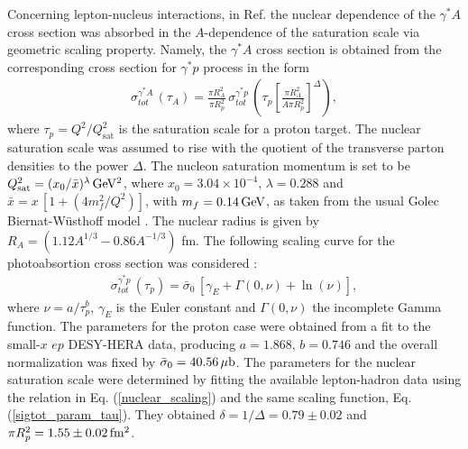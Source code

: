 \documentclass[twocolumn,showpacs,preprintnumbers,amsmath,amssymb,showkeys,aps,prd,a4paper,byrevtex]{revtex4}
\begin{document}
Concerning lepton-nucleus interactions, in Ref. \cite{Armesto_scal} the nuclear dependence of the $\gamma^*A$ cross section was absorbed in the $A$-dependence of the saturation scale via geometric scaling property. Namely, the $\gamma^*A$ cross section is obtained from the corresponding cross section for $\gamma^*p$ process in the form 
\begin{eqnarray}
 \sigma^{\gamma^*A}_{tot}\,(\tau_A)  =  \frac{\pi R_A^2}{\pi R_p^2}\,\sigma^{\gamma^*p}_{tot}\,\left(\tau_p\left[\frac{ \pi R_A^2}{A\pi R_p^2}\right]^{\Delta}\right),
\label{nuclear_scaling}
\end{eqnarray}
where $\tau_p = {Q^2}/{Q_{\mathrm{sat}}^2}$ is the saturation scale for a proton target.  The nuclear saturation scale was assumed to rise with the quotient of the transverse parton densities to the power $\Delta $. The nucleon saturation momentum is set to be $Q^2_{\mathrm{sat}}=\unit[(x_0/\bar{x})^{\lambda}]{GeV^2}$, where $x_0= 3.04\times 10^{-4}$, $\lambda=0.288$ and $\bar{x}=x\,[1+ (4m_f^2/Q^2)]$, with $m_f=\unit[0.14]{GeV}$, as taken from the usual Golec Biernat-W\"usthoff model \cite{GBW}. The nuclear radius is given by $R_A=(1.12 A^{1/3}-0.86 A^{-1/3})$ fm. The following scaling curve for the photoabsortion cross section was considered \cite{Armesto_scal}:
\begin{eqnarray}
  \sigma^{\gamma^* p}_{tot}\,(\tau_p) = \bar{\sigma}_0\,
  \left[ \gamma_E + \Gamma\left(0,\nu \right) +
         \ln \left(\nu \right) \right],
 \label{sigtot_param_tau}
\end{eqnarray}
where $\nu = a/\tau_p^{b}$, $\gamma_E$ is the Euler constant and $\Gamma\left(0,\nu \right)$
the incomplete Gamma function. The parameters for the proton case were obtained from a fit to the small-$x$ $ep$ DESY-HERA data, producing $a=1.868$, $b=0.746$ and the overall  normalization was fixed by $\bar\sigma_0=\unit[40.56]{\mu b}$. The parameters for the nuclear saturation scale were determined by fitting the available lepton-hadron data using the relation in Eq. (\ref{nuclear_scaling}) and the same scaling function, Eq. (\ref{sigtot_param_tau}). They obtained $\delta=1/\Delta = 0.79\pm0.02$ and $\pi R_p^2=\unit[1.55 \pm 0.02]{fm^2}$. 
\end{document}
